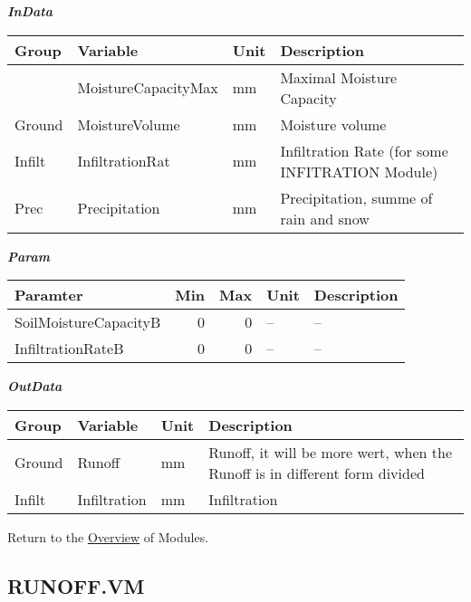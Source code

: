 \documentclass[
]{book}
\begin{document}
\textbf{\emph{InData}}

\begin{table}[!h]
\centering
\begin{tabular}{l|l|l|l}
\hline
Group & Variable & Unit & Description\\
\hline
 & MoistureCapacityMax & mm & Maximal Moisture Capacity\\
\cline{2-4}
\multirow{-2}{*}{\raggedright\arraybackslash Ground} & MoistureVolume & mm & Moisture volume\\
\cline{1-4}
Infilt & InfiltrationRat & mm & Infiltration Rate (for some INFITRATION Module)\\
\cline{1-4}
Prec & Precipitation & mm & Precipitation, summe of rain and snow\\
\hline
\end{tabular}
\end{table}

\textbf{\emph{Param}}

\begin{table}[!h]
\centering
\begin{tabular}{l|r|r|l|l}
\hline
Paramter & Min & Max & Unit & Description\\
\hline
SoilMoistureCapacityB & 0 & 0 & -- & --\\
\cline{1-5}
InfiltrationRateB & 0 & 0 & -- & --\\
\hline
\end{tabular}
\end{table}

\textbf{\emph{OutData}}

\begin{table}[!h]
\centering
\begin{tabular}{l|l|l|l}
\hline
Group & Variable & Unit & Description\\
\hline
Ground & Runoff & mm & Runoff, it will be more wert, when the Runoff is in different form divided\\
\cline{1-4}
Infilt & Infiltration & mm & Infiltration\\
\hline
\end{tabular}
\end{table}

Return to the \protect\hyperlink{module}{Overview} of Modules.

\hypertarget{RUNOFF.VM}{%
\subsection{RUNOFF.VM}\label{RUNOFF.VM}}
\end{document}
